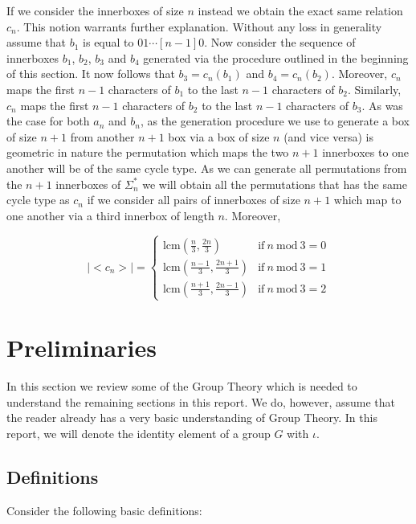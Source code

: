\documentclass[a4paper,10pt]{article}
\theoremstyle{definition}
\begin{document}
If we consider the innerboxes of size $n$ instead we obtain the exact same relation $c_n$. This notion warrants further explanation. Without any loss in generality assume that $b_1$ is equal to $01\cdots[n-1]0$. Now consider the sequence of innerboxes $b_1$, $b_2$, $b_3$ and $b_4$ generated via the procedure outlined in the beginning of this section. It now follows that $b_3 = c_n(b_1)$ and $b_4 = c_n(b_2)$. Moreover, $c_n$ maps the first $n-1$ characters of $b_1$ to the last $n-1$ characters of $b_2$. Similarly, $c_n$ maps the first $n-1$ characters of $b_2$ to the last $n-1$ characters of $b_3$. As was the case for both $a_n$ and $b_n$, as the generation procedure we use to generate a box of size $n+1$ from another $n+1$ box via a box of size $n$ (and vice versa) is geometric in nature the permutation which maps the two $n+1$ innerboxes to one another will be of the same cycle type. As we can generate all permutations from the $n+1$ innerboxes of $\Sigma_n^*$ we will obtain all the permutations that has the same cycle type as $c_n$ if we consider all pairs of innerboxes of size $n+1$ which map to one another via a third innerbox of length $n$. Moreover,

\begin{equation}
|\!\!<\!\!c_n\!\!>\!\!|= \left\{
\begin{array}{ll}
\textrm{lcm}(\frac{n}{3},\frac{2n}{3}) &\textrm{if}~n~\textrm{mod}~3=0\\
\textrm{lcm}(\frac{n-1}{3},\frac{2n+1}{3}) &\textrm{if}~n~\textrm{mod}~3=1\\
\textrm{lcm}(\frac{n+1}{3},\frac{2n-1}{3}) &\textrm{if}~n~\textrm{mod}~3=2
\end{array}
\right.
\end{equation}

\section{Preliminaries}
In this section we review some of the Group Theory which is needed to understand the remaining sections in this report. We do, however, assume that the reader already has a very basic understanding of Group Theory. In this report, we will denote the identity element of a group $G$ with $\iota$. 


\subsection{Definitions}
Consider the following basic definitions:
\end{document}
